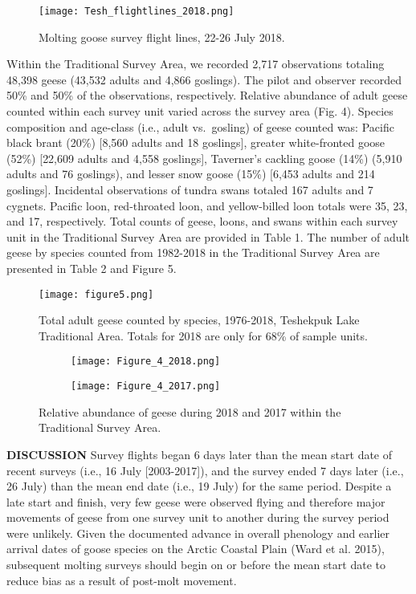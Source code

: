 \documentclass[]{article}
\begin{document}
\begin{figure}[H]
\texttt{[image: Tesh\_flightlines\_2018.png]}
\caption{Molting goose survey flight lines, 22-26 July 2018.}
\end{figure}

Within the Traditional Survey Area, we recorded 2,717 observations
totaling 48,398 geese (43,532 adults and 4,866 goslings). The pilot and
observer recorded 50\% and 50\% of the observations, respectively.
Relative abundance of adult geese counted within each survey unit varied
across the survey area (Fig. 4). Species composition and age-class
(i.e., adult vs.~gosling) of geese counted was: Pacific black brant
(20\%) {[}8,560 adults and 18 goslings{]}, greater white-fronted goose
(52\%) {[}22,609 adults and 4,558 goslings{]}, Taverner's cackling goose
(14\%) (5,910 adults and 76 goslings), and lesser snow goose (15\%)
{[}6,453 adults and 214 goslings{]}. Incidental observations of tundra
swans totaled 167 adults and 7 cygnets. Pacific loon, red-throated loon,
and yellow-billed loon totals were 35, 23, and 17, respectively. Total
counts of geese, loons, and swans within each survey unit in the
Traditional Survey Area are provided in Table 1. The number of adult
geese by species counted from 1982-2018 in the Traditional Survey Area
are presented in Table 2 and Figure 5.

\begin{figure}
\centering
\texttt{[image: figure5.png]}
\caption{Total adult geese counted by species,
1976-2018, Teshekpuk Lake Traditional Area. Totals for 2018 are only for
68\% of sample units.} 
\end{figure}

\begin{figure}[H]
\centering
\begin{subfigure}[h]{0.85\textwidth}
\texttt{[image: Figure\_4\_2018.png]}
\end{subfigure}
\begin{subfigure}[h]{0.85\textwidth}
\texttt{[image: Figure\_4\_2017.png]}
\end{subfigure}
\caption{Relative abundance of geese during 2018 and 2017 within the Traditional Survey Area.}
\end{figure}

\textbf{DISCUSSION}\newline
Survey flights began 6 days later than the mean start date of recent
surveys (i.e., 16 July {[}2003-2017{]}), and the survey ended 7 days
later (i.e., 26 July) than the mean end date (i.e., 19 July) for the
same period. Despite a late start and finish, very few geese were
observed flying and therefore major movements of geese from one survey
unit to another during the survey period were unlikely. Given the
documented advance in overall phenology and earlier arrival dates of
goose species on the Arctic Coastal Plain (Ward et al. 2015), subsequent
molting surveys should begin on or before the mean start date to reduce
bias as a result of post-molt movement.
\end{document}
